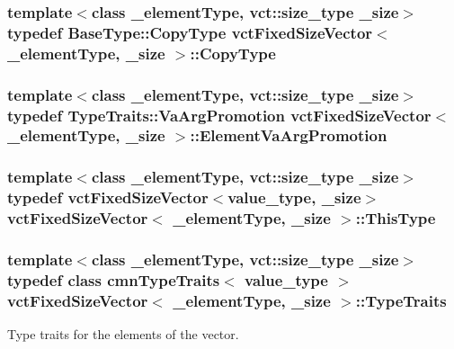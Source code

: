 \subsubsection[{Copy\+Type}]{\setlength{\rightskip}{0pt plus 5cm}template$<$class \+\_\+element\+Type, vct\+::size\+\_\+type \+\_\+size$>$ typedef {\bf Base\+Type\+::\+Copy\+Type} {\bf vct\+Fixed\+Size\+Vector}$<$ \+\_\+element\+Type, \+\_\+size $>$\+::{\bf Copy\+Type}}\label{classvct_fixed_size_vector_afcfc466ed71975aef98c2789fd3e4dcf}
\hypertarget{classvct_fixed_size_vector_a1adb96488f833cc25746022bdb2faf80}{}
\subsubsection[{Element\+Va\+Arg\+Promotion}]{\setlength{\rightskip}{0pt plus 5cm}template$<$class \+\_\+element\+Type, vct\+::size\+\_\+type \+\_\+size$>$ typedef Type\+Traits\+::\+Va\+Arg\+Promotion {\bf vct\+Fixed\+Size\+Vector}$<$ \+\_\+element\+Type, \+\_\+size $>$\+::{\bf Element\+Va\+Arg\+Promotion}}\label{classvct_fixed_size_vector_a1adb96488f833cc25746022bdb2faf80}
\hypertarget{classvct_fixed_size_vector_ab843a1db4f68a04960de8f4fea28adda}{}
\subsubsection[{This\+Type}]{\setlength{\rightskip}{0pt plus 5cm}template$<$class \+\_\+element\+Type, vct\+::size\+\_\+type \+\_\+size$>$ typedef {\bf vct\+Fixed\+Size\+Vector}$<$value\+\_\+type, \+\_\+size$>$ {\bf vct\+Fixed\+Size\+Vector}$<$ \+\_\+element\+Type, \+\_\+size $>$\+::{\bf This\+Type}}\label{classvct_fixed_size_vector_ab843a1db4f68a04960de8f4fea28adda}
\hypertarget{classvct_fixed_size_vector_a31021c195f3f1ccf57f4bede713bd629}{}
\subsubsection[{Type\+Traits}]{\setlength{\rightskip}{0pt plus 5cm}template$<$class \+\_\+element\+Type, vct\+::size\+\_\+type \+\_\+size$>$ typedef class {\bf cmn\+Type\+Traits}$<$ value\+\_\+type $>$ {\bf vct\+Fixed\+Size\+Vector}$<$ \+\_\+element\+Type, \+\_\+size $>$\+::{\bf Type\+Traits}}\label{classvct_fixed_size_vector_a31021c195f3f1ccf57f4bede713bd629}
Type traits for the elements of the vector. \hypertarget{classvct_fixed_size_vector_a82ab46671bc55178f97dd3245aed0600}{}
